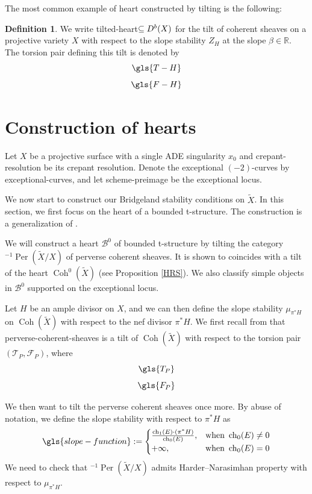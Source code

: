 \documentclass[12pt]{amsart}
\theoremstyle{definition}
\newtheorem{definition}[theorem]{Definition}
\DeclareMathOperator{\Coh}{Coh}
\DeclareMathOperator{\ch}{ch}
\DeclareMathOperator{\Per}{Per}
\begin{document}
The most common example of heart constructed by tilting is the following:

\begin{definition}\label{cohbeta}
We write \gls{tilted-heart}$ \subseteq \rm{D^b}(X)$ for the tilt of coherent sheaves on a projective variety $X$ with respect to the slope stability $Z_H$ at the slope $\beta \in \mathbb{R}$.
The torsion pair defining this tilt is denoted by 
\[ \gls{T-H}\]
\[ \gls{F-H}\]
\end{definition}

\section{Construction of hearts}
Let $X$ be a projective surface with a single ADE singularity $x_0$ and \gls{crepant-resolution} be its crepant resolution.
Denote the exceptional $(-2)$-curves by \gls{exceptional-curves}, and let \gls{scheme-preimage} be the exceptional locus.

We now start to construct our Bridgeland stability conditions on $\widetilde{X}$. 
In this section, we first focus on the heart of a bounded t-structure. The construction is a generalization of \cite[Sect. 3, 4]{TX22}.

We will construct a heart $\mathcal{B}^0$ of bounded t-structure by tilting the category $^{-1}\Per(\widetilde{X}/X)$ of perverse coherent sheaves.
It is shown to coincides with a tilt of the heart $\Coh^0(\widetilde{X})$ (see Proposition \ref{HRS}).
We also classify simple objects in $\mathcal{B}^0$ supported on the exceptional locus.


Let $H$ be an ample divisor on $X$,
and we can then define the slope stability $\mu_{\pi^\ast H}$ on $\Coh(\widetilde{X})$ with respect to the nef divisor $\pi^\ast H$.
We first recall from \cite{VdB04} that \gls{perverse-coherent-sheaves} is a tilt of $\Coh(\widetilde{X})$ with respect to the torsion pair $(\mathcal{T}_P,\mathcal{F}_P)$, where
\[ \gls{T_P}\]
\[ \gls{F_P}\]

We then want to tilt the perverse coherent sheaves once more.
By abuse of notation, we define the slope stability  with respect to $\pi^\ast H$ as \[\gls{slope-function}:= \begin{cases}
    \frac{\ch_1(E)\cdot (\pi^\ast H)}{\ch_0(E)}, & \text{when } \ch_0(E) \neq 0\\
    +\infty , & \text{when } \ch_0(E)=0 
\end{cases}
\]
We need to check that $^{-1}\Per(\widetilde{X}/X)$ admits Harder--Narasimhan property with respect to $\mu_{\pi^\ast H}$.
\end{document}
